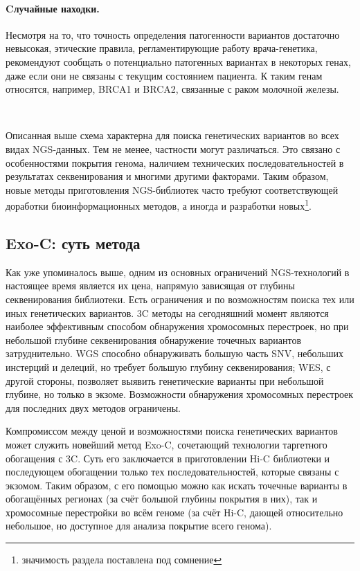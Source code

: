 \documentclass[a4paper,12pt]{article}
\begin{document}
\paragraph{Cлучайные находки.}
Несмотря на то, что точность определения патогенности вариантов достаточно невысокая, этические правила, регламентирующие работу врача-генетика, рекомендуют сообщать о потенциально патогенных вариантах в некоторых генах, даже если они не связаны с текущим состоянием пациента.
К таким генам относятся, например, BRCA1 и BRCA2, связанные с раком молочной железы.

~

Описанная выше схема характерна для поиска генетических вариантов во всех видах NGS-данных.
Тем не менее, частности могут различаться.
Это связано с особенностями покрытия генома, наличием технических последовательностей в результатах секвенирования и многими другими факторами.
Таким образом, новые методы приготовления NGS-библиотек часто требуют соответствующей доработки биоинформационных методов, а иногда и разработки новых\footnote{значимость раздела поставлена под сомнение}.

\subsection{Exo-C: суть метода}

Как уже упоминалось выше, одним из основных ограничений NGS-технологий в настоящее время является их цена, напрямую зависящая от глубины секвенирования библиотеки.
Есть ограничения и по возможностям поиска тех или иных генетических вариантов.
3C методы на сегодняшний момент являются наиболее эффективным способом обнаружения хромосомных перестроек, но при небольшой глубине секвенирования обнаружение точечных вариантов затруднительно.
WGS способно обнаруживать большую часть SNV, небольших инстерций и делеций, но требует большую глубину секвенирования; WES, с другой стороны, позволяет выявить генетические варианты при небольшой глубине, но только в экзоме.
Возможности обнаружения хромосомных перестроек для последних двух методов ограничены.

Компромиссом между ценой и возможностями поиска генетических вариантов может служить новейший метод Exo-C, сочетающий технологии таргетного обогащения с 3C.
Суть его заключается в приготовлении Hi-C библиотеки и последующем обогащении только тех последовательностей, которые связаны с экзомом.
Таким образом, с его помощью можно как искать точечные варианты в обогащённых регионах (за счёт большой глубины покрытия в них), так и хромосомные перестройки во всём геноме (за счёт Hi-C, дающей относительно небольшое, но доступное для анализа покрытие всего генома)\cite{Mozheiko_2019}.
\end{document}
